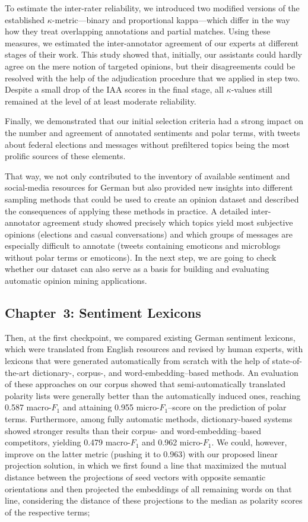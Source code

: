 \documentclass[11pt]{article}
\newcommand{\F}[0]{$F_1$}
\begin{document}
To estimate the inter-rater reliability, we introduced two modified
versions of the established $\kappa$-metric---binary and proportional
kappa---which differ in the way how they treat overlapping annotations
and partial matches.  Using these measures, we estimated the
inter-annotator agreement of our experts at different stages of their
work.  This study showed that, initially, our assistants could hardly
agree on the mere notion of targeted opinions, but their disagreements
could be resolved with the help of the adjudication procedure that we
applied in step two.  Despite a small drop of the IAA scores in the
final stage, all $\kappa$-values still remained at the level of at
least moderate reliability.

Finally, we demonstrated that our initial selection criteria had a
strong impact on the number and agreement of annotated sentiments and
polar terms, with tweets about federal elections and messages without
prefiltered topics being the most prolific sources of these elements.

That way, we not only contributed to the inventory of available
sentiment and social-media resources for German but also provided new
insights into different sampling methods that could be used to create
an opinion dataset and described the consequences of applying these
methods in practice.  A detailed inter-annotator agreement study
showed precisely which topics yield most subjective opinions
(elections and casual conversations) and which groups of messages are
especially difficult to annotate (tweets containing emoticons and
microblogs without polar terms or emoticons).  In the next step, we
are going to check whether our dataset can also serve as a basis for
building and evaluating automatic opinion mining applications.

\subsection{Chapter~3: Sentiment Lexicons}

Then, at the first checkpoint, we compared existing German sentiment
lexicons, which were translated from English resources and revised by
human experts, with lexicons that were generated automatically from
scratch with the help of state-of-the-art dictionary\mbox{-,}
corpus\mbox{-,} and word-embedding--based methods.  An evaluation of
these approaches on our corpus showed that semi-automatically
translated polarity lists were generally better than the automatically
induced ones, reaching 0.587 macro-\F{} and attaining 0.955
micro-\F{}--score on the prediction of polar terms.  Furthermore,
among fully automatic methods, dictionary-based systems showed
stronger results than their corpus- and word-embedding--based
competitors, yielding 0.479 macro-\F{} and 0.962 micro-\F{}.  We
could, however, improve on the latter metric (pushing it to 0.963)
with our proposed linear projection solution, in which we first found
a line that maximized the mutual distance between the projections of
seed vectors with opposite semantic orientations and then projected
the embeddings of all remaining words on that line, considering the
distance of these projections to the median as polarity scores of the
respective terms;
\end{document}
